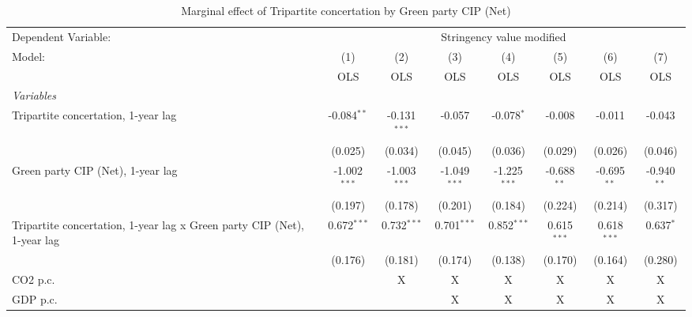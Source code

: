 
\begin{table}[htbp]
   \caption{Marginal effect of Tripartite concertation by Green party CIP (Net)}
   \centering
   \begin{tabular}{lccccccc}
      \toprule
      Dependent Variable: & \multicolumn{7}{c}{Stringency value modified}\\
      Model:                                                                  & (1)            & (2)            & (3)            & (4)            & (5)           & (6)           & (7)\\  
                                                                              &  OLS           & OLS            & OLS            & OLS            & OLS           & OLS           & OLS\\  
      \midrule
      \emph{Variables}\\
      Tripartite concertation, 1-year lag                                     & -0.084$^{**}$  & -0.131$^{***}$ & -0.057         & -0.078$^{*}$   & -0.008        & -0.011        & -0.043\\   
                                                                              & (0.025)        & (0.034)        & (0.045)        & (0.036)        & (0.029)       & (0.026)       & (0.046)\\   
      Green party CIP (Net), 1-year lag                                       & -1.002$^{***}$ & -1.003$^{***}$ & -1.049$^{***}$ & -1.225$^{***}$ & -0.688$^{**}$ & -0.695$^{**}$ & -0.940$^{**}$\\   
                                                                              & (0.197)        & (0.178)        & (0.201)        & (0.184)        & (0.224)       & (0.214)       & (0.317)\\   
      Tripartite concertation, 1-year lag x Green party CIP (Net), 1-year lag & 0.672$^{***}$  & 0.732$^{***}$  & 0.701$^{***}$  & 0.852$^{***}$  & 0.615$^{***}$ & 0.618$^{***}$ & 0.637$^{*}$\\   
                                                                              & (0.176)        & (0.181)        & (0.174)        & (0.138)        & (0.170)       & (0.164)       & (0.280)\\   
      CO2 p.c.                                                                &                & X              & X              & X              & X             & X             & X\\  
      GDP p.c.                                                                &                &                & X              & X              & X             & X             & X\\  

\end{tabular}
\end{table}

